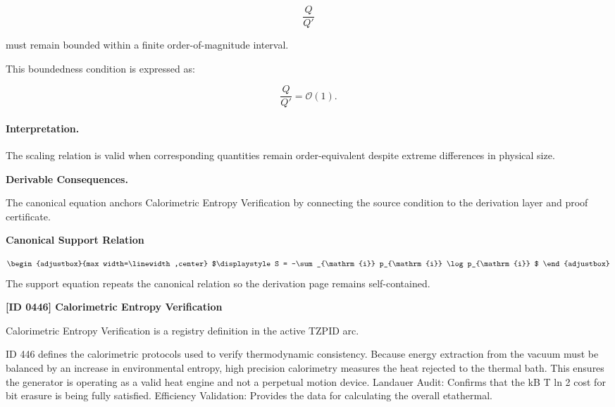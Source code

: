 \begin{equation}
\frac{Q}{Q'}
\end{equation}

must remain bounded within a finite order-of-magnitude interval.

This boundedness condition is expressed as:

\begin{equation}
\boxed{
\frac{Q}{Q'}
=
\mathcal{O}(1).
}
\end{equation}

\paragraph{Interpretation.}
The scaling relation is valid when corresponding quantities remain order-equivalent despite extreme differences in physical size.

\par\vspace{0.35em}
\noindent\textbf{Derivable Consequences.}\quad
\begingroup
\footnotesize
\raggedright
The canonical equation anchors Calorimetric Entropy Verification by connecting the source condition to the derivation layer and proof certificate.
\par\endgroup

\noindent\textbf{Canonical Support Relation}\par
\[
\begin{adjustbox}{max width=\linewidth,center}
$\displaystyle
S = -\sum_{\mathrm{i}} p_{\mathrm{i}} \log p_{\mathrm{i}}
$
\end{adjustbox}
\]
\noindent The support equation repeats the canonical relation so the derivation page remains self-contained.\par

\clearpage
\noindent\textbf{[ID 0446] Calorimetric Entropy Verification}\par
\vspace{0.35em}
\begingroup\small
{}
Calorimetric Entropy Verification is a registry definition in the active TZPID arc.

ID 446 defines the calorimetric protocols used to verify thermodynamic consistency. Because energy extraction from the vacuum must be balanced by an increase in environmental entropy, high precision calorimetry measures the heat rejected to the thermal bath. This ensures the generator is operating as a valid heat engine and not a perpetual motion device. Landauer Audit: Confirms that the kB T ln 2 cost for bit erasure is being fully satisfied. Efficiency Validation: Provides the data for calculating the overall etathermal.


